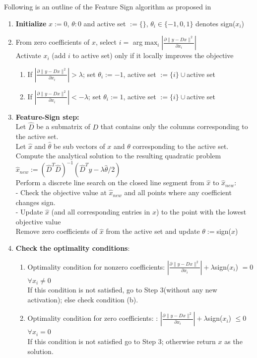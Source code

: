 \documentclass{article} %
\begin{document}
Following is an outline of the Feature Sign algorithm as proposed in \citep{lee2007efficient}

\begin{enumerate}
\item \textbf{Initialize} $x := 0$, $\theta : 0$ and active set $:= \{\}$, $\theta_i \in \{-1,0,1\}$ denotes sign($x_i$)
\item From zero coefficients of $x$, select $i = $ arg$\max_i |\frac{\partial\|y - Dx\|^2}{\partial x_i}|$\\
Activate $x_i$ (add $i$ to active set) only if it locally improves the objective
\begin{enumerate}
\item If $|\frac{\partial\|y - Dx\|^2}{\partial x_i}| > \lambda$; set $\theta_i := -1$, active set $:= \{i\} \cup$active set
\item If $|\frac{\partial\|y - Dx\|^2}{\partial x_i}| < -\lambda$; set $\theta_i := 1$, active set $:= \{i\} \cup$active set
\end{enumerate}
\item \textbf{Feature-Sign step:}\\
Let $\hat{D}$ be a submatrix of $D$ that contains only the columns corresponding to the active set.\\
Let $\hat{x}$ and $\hat{\theta}$ be sub vectors of $x$ and $\theta$ corresponding to the active set.\\
Compute the analytical solution to the resulting quadratic problem\\
$\hat{x}_{new} := (\hat{D}^T\hat{D})^{-1}(\hat{D}^Ty - \lambda \hat{\theta}/2)$\\
Perform a discrete line search on the closed line segment from $\hat{x}$ to $\hat{x}_{new}$:\\
- Check the objective value at $\hat{x}_{new}$ and all points where any coefficient changes sign.\\
- Update $\hat{x}$ (and all corresponding entries in $x$) to the point with the lowest objective value\\
Remove zero coefficients of $\hat{x}$ from the active set and update $\theta := $sign($x$)
\item \textbf{Check the optimality conditions}:
\begin{enumerate}
\item Optimality condition for nonzero coefficients: $|\frac{\partial\|y - Dx\|^2}{\partial x_i}| + \lambda$sign($x_i$) $=  0$ $\forall x_i \neq 0$\\
If this condition is not satisfied, go to Step 3(without any new activation); else check condition (b).
\item  Optimality condition for zero coefficients: : $|\frac{\partial\|y - Dx\|^2}{\partial x_i}| + \lambda$sign($x_i$) $\leq 0$ $\forall x_i = 0$\\
If this condition is not satisfied go to Step 3; otherwise return $x$ as the solution.
\end{enumerate} 
\end{enumerate}
\end{document}
